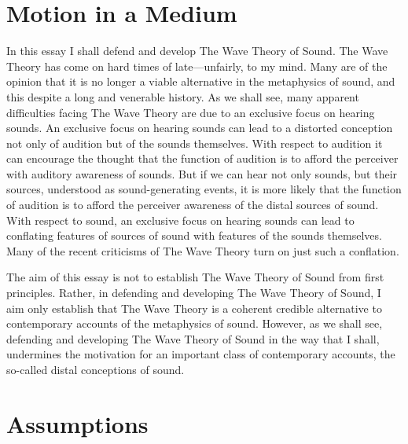 \documentclass[12pt]{article}
\title{\mytitle}
\author{\myauthor}
\date{} %
\begin{document}
\maketitle

\setlength{\parindent}{1em}


\section{Motion in a Medium} %
\label{sec:motion_in_a_medium}

In this essay I shall defend and develop The Wave Theory of Sound. The Wave Theory has come on hard times of late---unfairly, to my mind. Many are of the opinion that it is no longer a viable alternative in the metaphysics of sound, and this despite a long and venerable history. As we shall see, many apparent difficulties facing The Wave Theory are due to an exclusive focus on hearing sounds. An exclusive focus on hearing sounds can lead to a distorted conception not only of audition but of the sounds themselves. With respect to audition it can encourage the thought that the function of audition is to afford the perceiver with auditory awareness of sounds. But if we can hear not only sounds, but their sources, understood as sound-generating events, it is more likely that the function of audition is to afford the perceiver awareness of the distal sources of sound. With respect to sound, an exclusive focus on hearing sounds can lead to conflating features of sources of sound with features of the sounds themselves. Many of the recent criticisms of The Wave Theory turn on just such a conflation.

The aim of this essay is not to establish The Wave Theory of Sound from first principles. Rather, in defending and developing The Wave Theory of Sound, I aim only establish that The Wave Theory is a coherent credible alternative to contemporary accounts of the metaphysics of sound. However, as we shall see, defending and developing The Wave Theory of Sound in the way that I shall, undermines the motivation for an important class of contemporary accounts, the so-called distal conceptions of sound. 


\section{Assumptions} %
\label{sec:section_name}
\end{document}
